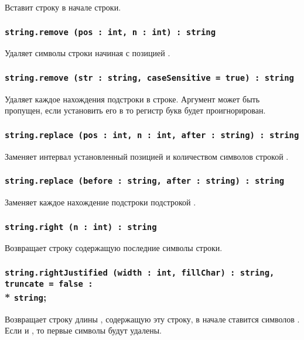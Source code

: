 Вставит строку  в начале строки.

\subsubsection{\lstinline|string.remove (pos : int, n : int) : string|}

Удаляет  символы строки начиная с позицией .

\subsubsection{\lstinline|string.remove (str : string, caseSensitive = true) : string|}

Удаляет каждое нахождения подстроки  в строке. Аргумент  может быть пропущен, если установить его в \false{} то регистр букв будет проигнорирован.

\subsubsection{\lstinline|string.replace (pos : int, n : int, after : string) : string|}

Заменяет интервал установленный позицией  и количеством символов  строкой .

\subsubsection{\lstinline|string.replace (before : string, after : string) : string|}

Заменяет каждое нахождение подстроки  подстрокой .

\subsubsection{\lstinline|string.right (n : int) : string|}

Возвращает строку содержащую последние  символы строки.

\subsubsection{\lstinline|string.rightJustified (width : int, fillChar) : string, truncate = false :|\\* \lstinline|string|;}

Возвращает строку длины , содержащую эту строку, в начале ставится  символов . Если  и , то первые  символы будут удалены.

